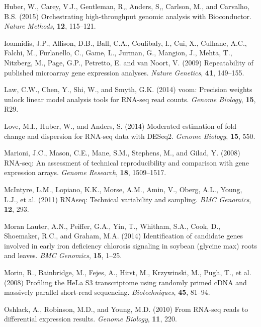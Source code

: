 \documentclass{bioinfo}
\begin{document}
\begin{thebibliography}{}
Huber, W., Carey, V.J., Gentleman, R,, Anders, S,, Carlson, M., and Carvalho, B.S. (2015) Orchestrating high-throughput genomic analysis with Bioconductor. {\it Nature Methods}, {\bf 12}, 115--121.

Ioannidis, J.P., Allison, D.B., Ball, C.A., Coulibaly, I., Cui, X., Culhane, A.C., Falchi, M., Furlanello, C., Game, L., Jurman, G., Mangion, J., Mehta, T., Nitzberg, M., Page, G.P., Petretto, E. and van Noort, V. (2009) Repeatability of published microarray gene expression analyses. {\it Nature Genetics}, {\bf 41}, 149--155.

Law, C.W., Chen, Y., Shi, W., and Smyth, G.K. (2014) voom: Precision weights unlock linear model analysis tools for RNA-seq read counts. {\it Genome Biology}, {\bf 15}, R29.

Love, M.I., Huber, W., and Anders, S. (2014) Moderated estimation of fold change and dispersion for RNA-seq data with DESeq2. {\it Genome Biology}, {\bf 15}, 550.

Marioni, J.C., Mason, C.E., Mane, S.M., Stephens, M., and Gilad, Y. (2008) RNA-seq: An assessment of technical reproducibility and comparison with gene expression arrays. {\it Genome Research}, {\bf 18}, 1509--1517.

McIntyre, L.M., Lopiano, K.K., Morse, A.M., Amin, V., Oberg, A.L., Young, L.J., et al. (2011) RNAseq: Technical variability and sampling. {\it BMC Genomics}, {\bf 12}, 293.

Moran Lauter, A.N., Peiffer, G.A., Yin, T., Whitham, S.A., Cook, D., Shoemaker, R.C., and Graham, M.A. (2014) Identification of candidate genes involved in early iron deficiency chlorosis signaling in soybean (glycine max) roots and leaves. {\it BMC Genomics}, {\bf 15}, 1--25.

Morin, R., Bainbridge, M., Fejes, A., Hirst, M., Krzywinski, M., Pugh, T., et al. (2008) Profiling the HeLa S3 transcriptome using randomly primed cDNA and massively parallel short-read sequencing. {\it Biotechniques}, {\bf 45}, 81--94.

Oshlack, A., Robinson, M.D., and Young, M.D. (2010) From RNA-seq reads to differential expression results.
{\it Genome Biology}, {\bf 11}, 220.


\end{thebibliography}
\end{document}
